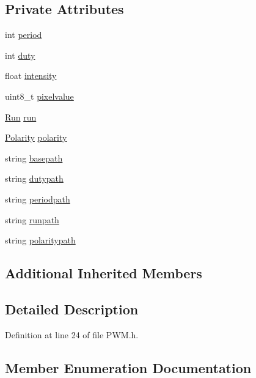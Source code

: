 \subsection*{Private Attributes}
\begin{DoxyCompactItemize}
\item 
int \hyperlink{class_hardware_1_1_p_w_m_a91323a511e37d396f46d08f4159ef761}{period}
\item 
int \hyperlink{class_hardware_1_1_p_w_m_a3309b2645c4c817384d91f33f0df5d64}{duty}
\item 
float \hyperlink{class_hardware_1_1_p_w_m_afcfc81ddeeb9c510ad4d00b215477d7a}{intensity}
\item 
uint8\+\_\+t \hyperlink{class_hardware_1_1_p_w_m_a27de0bd1068a57a970d21bbbe4fc0872}{pixelvalue}
\item 
\hyperlink{class_hardware_1_1_p_w_m_a6f1e614731154a3613c03a4238ddd107}{Run} \hyperlink{class_hardware_1_1_p_w_m_a04531646b41accced24d46046c4bc7de}{run}
\item 
\hyperlink{class_hardware_1_1_p_w_m_a728111433109229b4da1efc953a107c1}{Polarity} \hyperlink{class_hardware_1_1_p_w_m_ad346586d086f8462c3de6a4c19edb1d3}{polarity}
\item 
string \hyperlink{class_hardware_1_1_p_w_m_a344f82a0812dceb40aa48d4789d09c68}{basepath}
\item 
string \hyperlink{class_hardware_1_1_p_w_m_a53311e9df6960751465d5f0b81192226}{dutypath}
\item 
string \hyperlink{class_hardware_1_1_p_w_m_a27e17a6c2e9720c571d5939f1a9ffb12}{periodpath}
\item 
string \hyperlink{class_hardware_1_1_p_w_m_ac1eb93467481ee2bd3565f1be47b8a01}{runpath}
\item 
string \hyperlink{class_hardware_1_1_p_w_m_ace89c96484ffa9d6c9f3a8067848bf51}{polaritypath}
\end{DoxyCompactItemize}
\subsection*{Additional Inherited Members}


\subsection{Detailed Description}


Definition at line 24 of file P\+W\+M.\+h.



\subsection{Member Enumeration Documentation}
\hypertarget{class_hardware_1_1_p_w_m_a7cc6acf1c28f0eaef16246635dc0353a}{}
